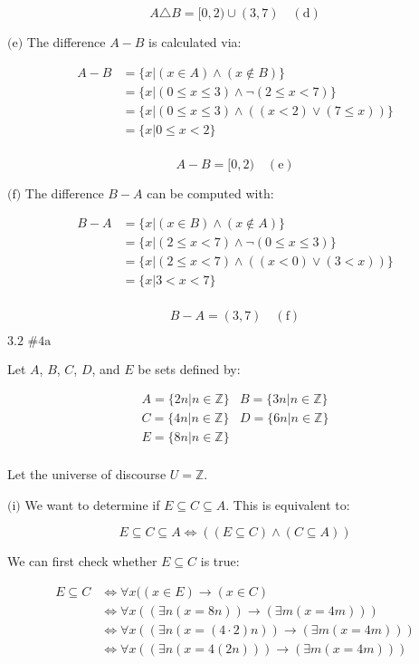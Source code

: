 \documentclass{article}
\newcommand{\problem}[2]{$\boxed{\text{#1 \##2}}$}
\newcommand{\subproblem}[1]{$\boxed{\text{(#1)}}$}
\newcommand{\subsolution}[2]{\boxed{#2\quad(\text{#1})}}
\newcommand{\multistep}[1]{\begin{array}{rl} #1 \end{array}}
\begin{document}
\begin{multicols*}{2}
\[
\subsolution{d}{A\triangle B=\lbrack0,2)\cup(3,7)}
\]

%
\subproblem{e} The difference $A-B$ is calculated via:

\[
\multistep{
A-B&=\{x|(x\in A)\wedge(x\not\in B)\} \\
&=\{x|(0\le x\le 3)\wedge\neg(2\le x<7)\} \\
&=\{x|(0\le x\le 3)\wedge((x<2)\vee(7\le x))\} \\
&=\{x|0\le x<2\} \\
}
\]

\[
\subsolution{e}{A-B=\lbrack0,2)}
\]

%
\subproblem{f} The difference $B-A$ can be computed with:

\[
\multistep{
B-A&=\{x|(x\in B)\wedge(x\not\in A)\} \\
&=\{x|(2\le x<7)\wedge\neg(0\le x\le 3)\} \\
&=\{x|(2\le x<7)\wedge((x<0)\vee(3<x))\} \\
&=\{x|3<x<7\} \\
}
\]

\[
\subsolution{f}{B-A=(3,7)}
\]

%
\problem{3.2}{4a}

Let $A$, $B$, $C$, $D$, and $E$ be sets defined by:

\[
\begin{array}{cc}
A=\{2n|n\in\mathbb{Z}\} & B=\{3n|n\in\mathbb{Z}\} \\
C=\{4n|n\in\mathbb{Z}\} & D=\{6n|n\in\mathbb{Z}\} \\
E=\{8n|n\in\mathbb{Z}\} & \\
\end{array}
\]

Let the universe of discourse $U=\mathbb{Z}$.

%
\subproblem{i} We want to determine if
$E\subseteq{}C\subseteq{}A$. This is equivalent to:

\[
E\subseteq{}C\subseteq{}A\Leftrightarrow((E\subseteq C)\wedge(C\subseteq A))
\]

We can first check whether $E\subseteq{}C$ is true:

\[
\multistep{
E\subseteq{}C&\Leftrightarrow \forall x((x\in E)\rightarrow(x\in C) \\
&\Leftrightarrow \forall x((\exists n(x=8n))\rightarrow(\exists m(x=4m))) \\
&\Leftrightarrow \forall x((\exists n(x=(4\cdot2)n))\rightarrow(\exists m(x=4m))) \\
&\Leftrightarrow \forall x((\exists n(x=4(2n)))\rightarrow(\exists m(x=4m))) \\
}
\]


\end{multicols*}
\end{document}
